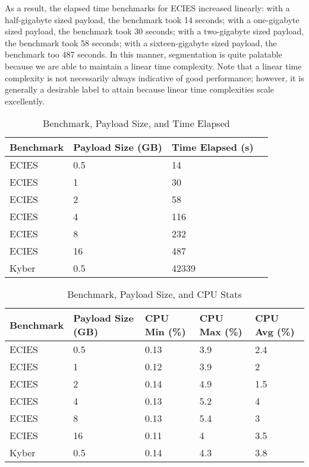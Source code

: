 \documentclass[a4paper]{article}
\begin{document}
As a result, the elapsed time benchmarks for ECIES increased linearly:
with a half-gigabyte sized payload, the benchmark took 14 seconds; with
a one-gigabyte sized payload, the benchmark took 30 seconds; with a
two-gigabyte sized payload, the benchmark took 58 seconds; with a
sixteen-gigabyte sized payload, the benchmark too 487 seconds. In this
manner, segmentation is quite palatable because we are able to maintain
a linear time complexity. Note that a linear time complexity is not
necessarily always indicative of good performance; however, it is
generally a desirable label to attain because linear time complexities
scale excellently.
  \begin{table}[htbp]
      \centering
      \caption{Benchmark, Payload Size, and Time Elapsed}
      \label{tab:benchmark-payload-time}
      \begin{tabular}{@{}llll@{}}
          \toprule
          Benchmark & Payload Size (GB) & Time Elapsed (s) \\ \midrule
          ECIES     & 0.5               & 14               \\
          ECIES     & 1                 & 30               \\
          ECIES     & 2                 & 58               \\
          ECIES     & 4                 & 116              \\
          ECIES     & 8                 & 232              \\
          ECIES     & 16                & 487              \\
          Kyber     & 0.5               & 42339            \\ \bottomrule
      \end{tabular}
  \end{table}

  \begin{table}[htbp]
      \centering
      \caption{Benchmark, Payload Size, and CPU Stats}
      \label{tab:benchmark-payload-cpu}
      \begin{tabular}{@{}lllll@{}}
          \toprule
          Benchmark & Payload Size (GB) & CPU Min (\%) & CPU Max (\%) & CPU Avg (\%) \\ \midrule
          ECIES     & 0.5               & 0.13         & 3.9          & 2.4          \\
          ECIES     & 1                 & 0.12         & 3.9          & 2            \\
          ECIES     & 2                 & 0.14         & 4.9          & 1.5          \\
          ECIES     & 4                 & 0.13         & 5.2          & 4            \\
          ECIES     & 8                 & 0.13         & 5.4          & 3            \\
          ECIES     & 16                & 0.11         & 4            & 3.5          \\
          Kyber     & 0.5               & 0.14         & 4.3          & 3.8          \\ \bottomrule
      \end{tabular}
  \end{table}
\end{document}
